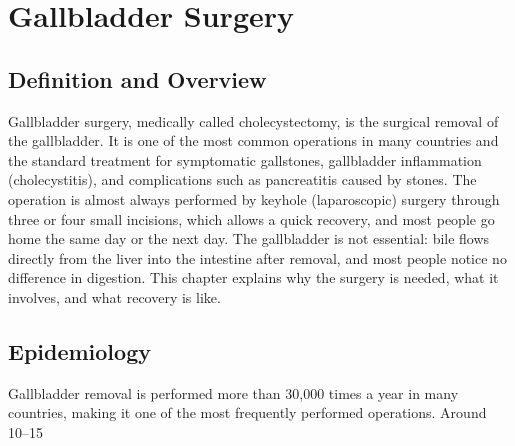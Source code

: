 \chapter{Gallbladder Surgery}

\section*{Definition and Overview}
Gallbladder surgery, medically called cholecystectomy, is the surgical removal of the gallbladder. It is one of the most common operations in many countries and the standard treatment for symptomatic gallstones, gallbladder inflammation (cholecystitis), and complications such as pancreatitis caused by stones. The operation is almost always performed by keyhole (laparoscopic) surgery through three or four small incisions, which allows a quick recovery, and most people go home the same day or the next day. The gallbladder is not essential: bile flows directly from the liver into the intestine after removal, and most people notice no difference in digestion. This chapter explains why the surgery is needed, what it involves, and what recovery is like.

\section*{Epidemiology}
Gallbladder removal is performed more than 30,000 times a year in many countries, making it one of the most frequently performed operations. Around 10--15%

